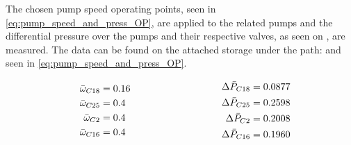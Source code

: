 

The chosen pump speed operating points, seen in \ref{eq:pump_speed_and_press_OP}, are applied to the related pumps and the differential pressure over the pumps and their respective valves, as seen on , are measured. 
The data can be found on the attached storage under the path:  and seen in \ref{eq:pump_speed_and_press_OP}.



\begin{equation}
\centering
  \begin{minipage}[b]{0.45\textwidth}
  \begin{equation*}
  	\begin{split}
    \bar{\omega}_{C18} &= 0.16\\
	\bar{\omega}_{C25} &= 0.4\\
	\bar{\omega}_{C2}  &= 0.4\\
	\bar{\omega}_{C16} &= 0.4
  	\end{split}
  \end{equation*}
  \end{minipage}
  \hfill
  \begin{minipage}[b]{0.45\textwidth}
  \begin{equation*}
  	\begin{split}
  	\Delta \bar{P}_{C18} &= 0.0877 \\
	\Delta \bar{P}_{C25} &= 0.2598 \\
	\Delta \bar{P}_{C2} &= 0.2008 \\
	\Delta \bar{P}_{C16} &=0.1960 
  	\end{split}
  \end{equation*}
  \end{minipage}
  \label{eq:pump_speed_and_press_OP}
\end{equation}

